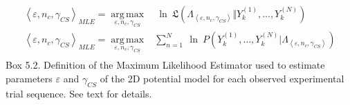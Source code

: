 \documentclass[10pt]{article}
\begin{document}
\begin{align*}
\left\langle\varepsilon,n_c,\gamma_{CS}\right\rangle_{MLE} =\underset{\varepsilon,n_c,\gamma_{CS}}{\operatorname{arg\,max}}&\ \ln\ \mathfrak{L} \left(\Lambda_{\left\langle \varepsilon,n_c,\gamma_{CS}\right\rangle} \Vert Y_{k}^{(1)},…,Y_{k}^{(N)} \right)\\
\left\langle\varepsilon,n_c,\gamma_{CS}\right\rangle_{MLE} =\underset{\varepsilon,n_c,\gamma_{CS}}{\operatorname{arg\,max}}& \sum_{n=1}^{N}\ \ln \ P \left(Y_{k}^{(1)},…,Y_{k}^{(N)}\vert \Lambda_{\left\langle \varepsilon,n_c,\gamma_{CS}\right\rangle} \right)\\
\end{align*}
Box 5.2. Definition of the Maximum Likelihood Estimator used to estimate  parameters $\varepsilon$ and $\gamma_{CS}$ of the 2D potential model for each observed experimental trial sequence. See text for details.
\end{document}
